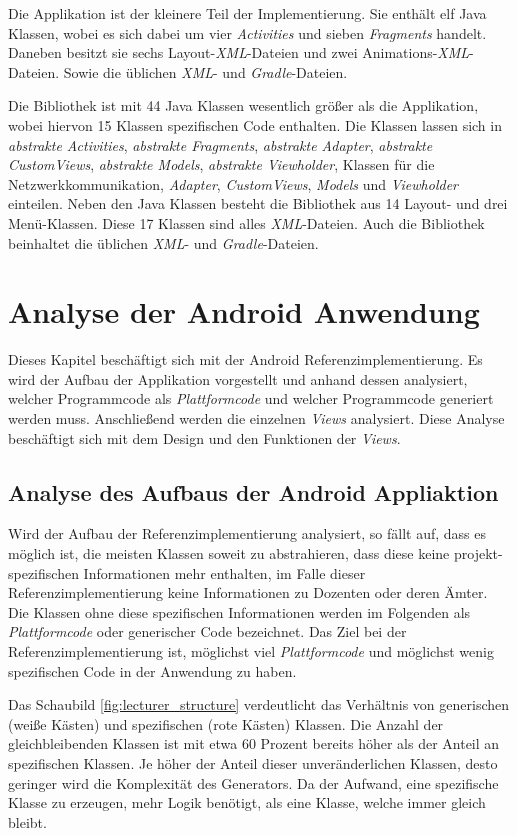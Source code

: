 Die Applikation ist der kleinere Teil der Implementierung. Sie enthält elf Java Klassen, wobei es sich dabei um vier \textit{Activities} und sieben \textit{Fragments} handelt. Daneben besitzt sie sechs Layout-\textit{XML}-Dateien und zwei Animations-\textit{XML}-Dateien. Sowie die üblichen \textit{XML}- und \textit{Gradle}-Dateien.

Die Bibliothek ist mit 44 Java Klassen wesentlich größer als die Applikation, wobei hiervon 15 Klassen spezifischen Code enthalten. Die Klassen lassen sich in \textit{abstrakte Activities}, \textit{abstrakte Fragments}, \textit{abstrakte Adapter}, \textit{abstrakte CustomViews}, \textit{abstrakte Models}, \textit{abstrakte Viewholder},  Klassen für die Netzwerkkommunikation, \textit{Adapter}, \textit{CustomViews}, \textit{Models} und \textit{Viewholder} einteilen. Neben den Java Klassen besteht die Bibliothek aus 14 Layout- und drei Menü-Klassen. Diese 17 Klassen sind alles \textit{XML}-Dateien. Auch die Bibliothek beinhaltet die üblichen \textit{XML}- und \textit{Gradle}-Dateien.

\section{Analyse der Android Anwendung}
Dieses Kapitel beschäftigt sich mit der Android Referenzimplementierung. Es wird der Aufbau der Applikation vorgestellt und anhand dessen analysiert, welcher Programmcode als \textit{Plattformcode} und welcher Programmcode generiert werden muss. Anschließend werden die einzelnen \textit{Views} analysiert. Diese Analyse beschäftigt sich mit dem Design und den Funktionen der \textit{Views}.

\subsection{Analyse des Aufbaus der Android Appliaktion}
Wird der Aufbau der Referenzimplementierung analysiert, so fällt auf, dass es möglich ist, die meisten Klassen soweit zu abstrahieren, dass diese keine projekt-spezifischen Informationen mehr enthalten, im Falle dieser Referenzimplementierung keine Informationen zu Dozenten oder deren Ämter. Die Klassen ohne diese spezifischen Informationen werden im Folgenden als \textit{Plattformcode} oder generischer Code bezeichnet. Das Ziel bei der Referenzimplementierung ist, möglichst viel \textit{Plattformcode} und möglichst wenig spezifischen Code in der Anwendung zu haben. 

Das Schaubild \ref{fig:lecturer_structure} verdeutlicht das Verhältnis von generischen (weiße Kästen) und spezifischen (rote Kästen) Klassen. Die Anzahl der gleichbleibenden Klassen ist mit etwa 60 Prozent bereits höher als der Anteil an spezifischen Klassen. Je höher der Anteil dieser unveränderlichen Klassen, desto geringer wird die Komplexität des Generators. Da der Aufwand, eine spezifische Klasse zu erzeugen, mehr Logik benötigt, als eine Klasse, welche immer gleich bleibt.

